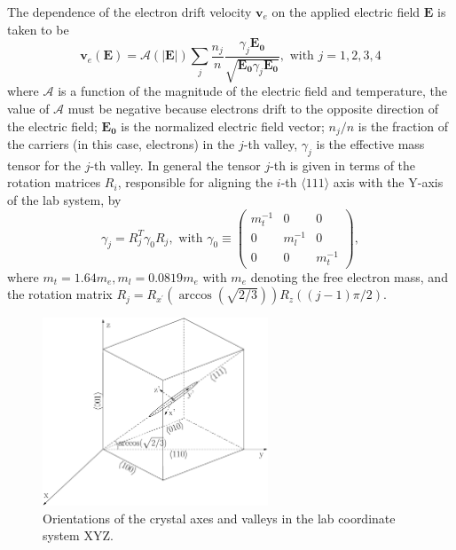 The dependence of the electron drift velocity $\mathbf{v}_{e}$ on the applied electric field $\mathbf{E}$ is taken to be
\begin{equation}
  \label{eq:ed}
  \mathbf{v}_{e}(\mathbf{E}) = \mathcal{A}(|\mathbf{E}|) \sum_{j} \frac{n_{j}}{n}     \frac{\gamma_{j}\mathbf{E_{0}}}     {\sqrt{\mathbf{E_{0}}\gamma_{j}\mathbf{E_{0}}}},  \mbox{ with }     j=1,2,3,4
\end{equation}
where $\mathcal{A}$ is a function of the magnitude of the electric field and temperature, the value of $\mathcal{A}$ must be negative because electrons drift to the opposite direction of the electric field; $\mathbf{E_{0}}$ is the normalized electric field vector; $n_{j}/n$ is the fraction  of the carriers (in this case, electrons) in the $j$-th valley, $\gamma_{j}$ is the effective mass tensor for the $j$-th valley. In general the tensor $j$-th is given in terms of the rotation matrices $R_{i}$, responsible for aligning the $i$-th $\langle 111 \rangle$ axis with the Y-axis of the lab system, by
\begin{equation}
  \label{eq:gammas}
  \gamma_{j} = R_{j}^{T}\gamma_{0}R_{j}, \mbox{ with } \gamma_{0}   \equiv \left(
    \begin{array}{ccc}
      m_{t}^{-1} & 0 & 0 \\
      0 & m_{l}^{-1} & 0 \\
      0 & 0 & m_{t}^{-1}
    \end{array} \right),
\end{equation}
where $m_{t} = 1.64m_{e}, m_{l} = 0.0819m_{e}$ with $m_{e}$ denoting the free electron mass, and the rotation matrix $R_{j} = R_{x^{\prime}}(\arccos(\sqrt{2/3}))R_{z}((j-1)\pi/2)$.

\begin{figure}[tbhp]
  \centering
  \includegraphics[width=0.6\textwidth]{axes.eps}  
  \caption{Orientations of the crystal axes and valleys in the lab coordinate system XYZ.}
  \label{fig:axes}
\end{figure}

